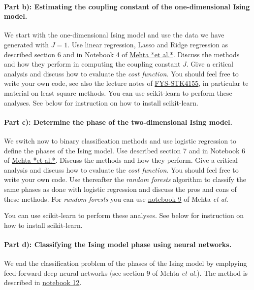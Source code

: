 \documentclass[%
oneside,                 %
final,                   %
10pt]{article}
\begin{document}
\paragraph{Part b): Estimating the coupling constant of the one-dimensional Ising model.}
We start with the one-dimensional Ising model and use the data we have generated with $J=1$. Use linear regression, Lasso and Ridge regression as described section 6 and in Notebook 4 of \href{{https://physics.bu.edu/~pankajm/ML-Notebooks/HTML/NB_CVI-linreg_ising.html}}{Mehta *et al.*}. Discuss the methods and how they perform in computing the coupling constant $J$. Give a critical analysis and discuss how to evaluate the \emph{cost function}. You should feel free to write your own code, see also
the lecture notes of \href{{https://compphysics.github.io/MachineLearning/doc/web/course.html}}{FYS-STK4155}, in particular te material on least square methods.  You can use scikit-learn to perform these analyses. See below for instruction on how to install scikit-learn.

\paragraph{Part c): Determine the phase of the two-dimensional Ising model.}
We switch now to binary classification methods and use logistic regression to define the phases of the Ising model.
Use described section 7 and in Notebook 6 of \href{{https://physics.bu.edu/~pankajm/ML-Notebooks/HTML/NB_CVII-logreg_ising.html}}{Mehta *et al.*}. Discuss the methods and how they perform. Give a critical analysis and discuss how to evaluate the \emph{cost function}. You should feel free to write your own code. Use thereafter the \emph{random forests} algorithm to classify the same phases as done with logistic regression and discuss the pros and cons of these methods. For \emph{random forests} you can use \href{{https://physics.bu.edu/~pankajm/ML-Notebooks/HTML/NB_CVIII-randomforests_ising.html}}{notebook 9} of Mehta \emph{et al.}

You can use scikit-learn to perform these analyses. See below for instruction on how to install scikit-learn.

\paragraph{Part d): Classifying the Ising model phase using neural networks.}
We end the classification problem of the phases of the Ising model by emplpying feed-forward deep neural networks (see section 9 of Mehta \emph{et al.}). The method is described in \href{{https://physics.bu.edu/~pankajm/ML-Notebooks/HTML/NB_CIX-DNN_ising_TFlow.html}}{notebook 12}. 
\end{document}
